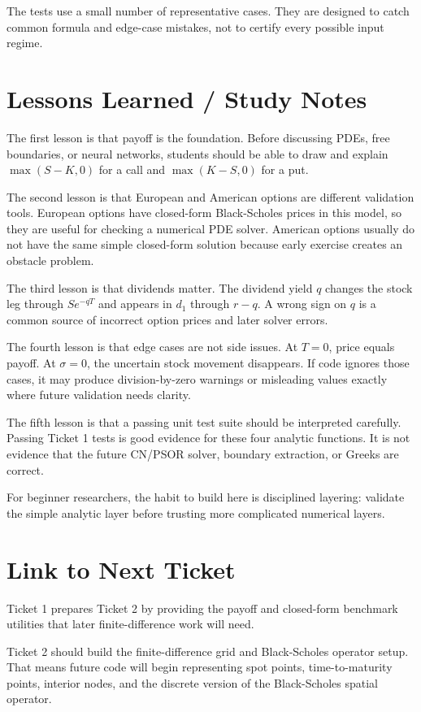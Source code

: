 \documentclass[11pt,a4paper]{article}
\begin{document}
The tests use a small number of representative cases. They are designed to catch common formula and
edge-case mistakes, not to certify every possible input regime.

\section{Lessons Learned / Study Notes}

The first lesson is that payoff is the foundation. Before discussing PDEs, free boundaries, or
neural networks, students should be able to draw and explain \(\max(S-K,0)\) for a call and
\(\max(K-S,0)\) for a put.

The second lesson is that European and American options are different validation tools. European
options have closed-form Black-Scholes prices in this model, so they are useful for checking a
numerical PDE solver. American options usually do not have the same simple closed-form solution
because early exercise creates an obstacle problem.

The third lesson is that dividends matter. The dividend yield \(q\) changes the stock leg through
\(S e^{-qT}\) and appears in \(d_1\) through \(r-q\). A wrong sign on \(q\) is a common source of
incorrect option prices and later solver errors.

The fourth lesson is that edge cases are not side issues. At \(T=0\), price equals payoff. At
\(\sigma=0\), the uncertain stock movement disappears. If code ignores those cases, it may produce
division-by-zero warnings or misleading values exactly where future validation needs clarity.

The fifth lesson is that a passing unit test suite should be interpreted carefully. Passing Ticket
1 tests is good evidence for these four analytic functions. It is not evidence that the future
CN/PSOR solver, boundary extraction, or Greeks are correct.

For beginner researchers, the habit to build here is disciplined layering: validate the simple
analytic layer before trusting more complicated numerical layers.

\section{Link to Next Ticket}

Ticket 1 prepares Ticket 2 by providing the payoff and closed-form benchmark utilities that later
finite-difference work will need.

Ticket 2 should build the finite-difference grid and Black-Scholes operator setup. That means future
code will begin representing spot points, time-to-maturity points, interior nodes, and the discrete
version of the Black-Scholes spatial operator.
\end{document}
